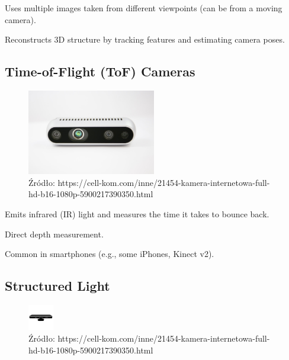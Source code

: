 \documentclass[magisterska]{pracadypl}
\begin{document}
Uses multiple images taken from different viewpoints (can be from a moving camera).

Reconstructs 3D structure by tracking features and estimating camera poses.

\subsection{Time-of-Flight (ToF) Cameras}

\begin{figure}[h]  %
    \centering  %
    \includegraphics[width=0.5\textwidth]{images/TOF-IR.jpg}  %
    \captionsetup{labelformat=empty, font=footnotesize}
    \caption{Źródło: https://cell-kom.com/inne/21454-kamera-internetowa-full-hd-b16-1080p-5900217390350.html}
    \label{fig:mono}  %
\end{figure}

Emits infrared (IR) light and measures the time it takes to bounce back.

Direct depth measurement.

Common in smartphones (e.g., some iPhones, Kinect v2).

\subsection{Structured Light}

\begin{figure}[h]  %
    \centering  %
    \includegraphics[width=0.1\textwidth]{images/POINTCLOUD.jpg}  %
    \captionsetup{labelformat=empty, font=footnotesize}
    \caption{Źródło: https://cell-kom.com/inne/21454-kamera-internetowa-full-hd-b16-1080p-5900217390350.html}
    \label{fig:mono}  %
\end{figure}
\end{document}
